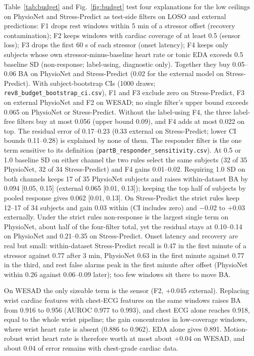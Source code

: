 \documentclass[journal]{IEEEtran}
\newcommand{\m}{$-$}
\begin{document}
Table~\ref{tab:budget} and Fig.~\ref{fig:budget} test four explanations for the low ceilings on PhysioNet and Stress-Predict as test-side filters on LOSO and external predictions: F1 drops rest windows within 5 min of a stressor offset (recovery contamination); F2 keeps windows with cardiac coverage of at least 0.5 (sensor loss); F3 drops the first 60 s of each stressor (onset latency); F4 keeps only subjects whose own stressor-minus-baseline heart rate or tonic EDA exceeds 0.5 baseline SD (non-response; label-using, diagnostic only). Together they buy 0.05--0.06 BA on PhysioNet and Stress-Predict (0.02 for the external model on Stress-Predict). With subject-bootstrap CIs (1000 draws; \texttt{rev8\_budget\_bootstrap\_ci.csv}), F1 and F3 exclude zero on Stress-Predict, F3 on external PhysioNet and F2 on WESAD; no single filter's upper bound exceeds 0.065 on PhysioNet or Stress-Predict. Without the label-using F4, the three label-free filters buy at most 0.056 (upper bound 0.09), and F4 adds at most 0.022 on top. The residual error of 0.17--0.23 (0.33 external on Stress-Predict; lower CI bounds 0.11--0.28) is explained by none of them. The responder filter is the one term sensitive to its definition (\texttt{partB\_responder\_sensitivity.csv}). At 0.5 or 1.0 baseline SD on either channel the two rules select the same subjects (32 of 35 PhysioNet, 32 of 34 Stress-Predict) and F4 gains 0.01--0.02. Requiring 1.0 SD on both channels keeps 17 of 35 PhysioNet subjects and raises within-dataset BA by 0.094 [0.05, 0.15] (external 0.065 [0.01, 0.13]); keeping the top half of subjects by pooled response gives 0.062 [0.01, 0.13]. On Stress-Predict the strict rules keep 12--17 of 34 subjects and gain 0.03 within (CI includes zero) and \m0.02 to +0.03 externally. Under the strict rules non-response is the largest single term on PhysioNet, about half of the four-filter total, yet the residual stays at 0.10--0.14 on PhysioNet and 0.21--0.35 on Stress-Predict. Onset latency and recovery are real but small: within-dataset Stress-Predict recall is 0.47 in the first minute of a stressor against 0.77 after 3 min, PhysioNet 0.63 in the first minute against 0.77 in the third, and rest false alarms peak in the first minute after offset (PhysioNet within 0.26 against 0.06--0.09 later); too few windows sit there to move BA.

On WESAD the only sizeable term is the sensor (F2, +0.045 external). Replacing wrist cardiac features with chest-ECG features on the same windows raises BA from 0.916 to 0.956 (AUROC 0.977 to 0.993), and chest ECG alone reaches 0.918, equal to the whole wrist pipeline; the gain concentrates in low-coverage windows, where wrist heart rate is absent (0.886 to 0.962). EDA alone gives 0.891. Motion-robust wrist heart rate is therefore worth at most about +0.04 on WESAD, and about 0.04 of error remains with chest-grade cardiac data.
\end{document}
